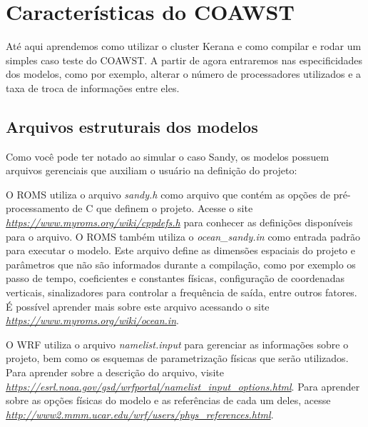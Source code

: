 \chapter{Características do COAWST}
\bigskip
\noindent Até aqui aprendemos como utilizar o cluster Kerana e como compilar e rodar um simples caso teste do COAWST. 
          A partir de agora entraremos nas especificidades dos modelos, como por exemplo, alterar o número de processadores utilizados
          e a taxa de troca de informações entre eles.
\bigskip

\section{Arquivos estruturais dos modelos}
\bigskip

\noindent Como você pode ter notado ao simular o caso Sandy, os modelos possuem arquivos gerenciais que auxiliam o usuário na definição 
          do projeto:
\bigskip

\noindent O ROMS utiliza o arquivo \textit{sandy.h} como arquivo que contém as opções de pré-processamento de C que definem o projeto.
          Acesse o site \textcolor{bleu_cite}{\href{https://www.myroms.org/wiki/cppdefs.h}{\textit{https://www.myroms.org/wiki/cppdefs.h}}} 
          para conhecer as definições disponíveis para o arquivo. O ROMS também utiliza o \textit{ocean\_sandy.in} como entrada padrão para 
          executar o modelo. Este arquivo define as dimensões espaciais do projeto e parâmetros que não são informados durante a compilação, 
          como por exemplo os passo de tempo, coeficientes e constantes físicas, configuração de coordenadas verticais, sinalizadores para 
          controlar a frequência de saída, entre outros fatores. É possível aprender mais sobre este arquivo acessando o 
          site \textcolor{bleu_cite}{\href{https://www.myroms.org/wiki/ocean.in}{\textit{https://www.myroms.org/wiki/ocean.in}}}.
\bigskip

\noindent O WRF utiliza o arquivo \textit{namelist.input} para gerenciar as informações sobre o projeto, bem como os 
          esquemas de parametrização físicas que serão utilizados. Para aprender sobre a descrição do arquivo, 
          visite \textcolor{bleu_cite}{\href{https://esrl.noaa.gov/gsd/wrfportal/namelist\_input\_options.html}{\textit{https://esrl.noaa.gov/gsd/wrfportal/namelist\_input\_options.html}}}.
          Para aprender sobre as opções físicas do modelo e as referências de cada um deles, acesse 
          \textcolor{bleu_cite}{\href{http://www2.mmm.ucar.edu/wrf/users/phys\_references.html}{\textit{http://www2.mmm.ucar.edu/wrf/users/phys\_references.html}}}.
\bigskip

